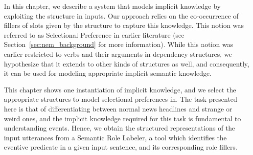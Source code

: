 In this chapter, we describe a system that models implicit knowledge by exploiting the structure
in inputs. Our approach relies on the co-occurrence of fillers of slots given by the structure to
capture this knowledge. This notion was referred to as Selectional Preference \citep{wilks1973preference}
in earlier literature (see Section~\ref{sec:nem_background} for more information). While this notion was earlier
restricted to verbs and their arguments in dependency structures, we hypothesize that it extends to
other kinds of structures as well, and consequently, it can be used for modeling appropriate implicit semantic knowledge.

This chapter shows one instantiation of implicit knowledge, and we select the appropriate structures to model selectional
preferences in. The task presented here is that of differentiating between normal news headlines and strange or weird ones,
and the implicit knowledge required for this task is fundamental to understanding events. Hence, we obtain the structured
representations of the input utterances from a Semantic Role Labeler, a tool which identifies the eventive predicate in a given
input sentence, and its corresponding role fillers.

